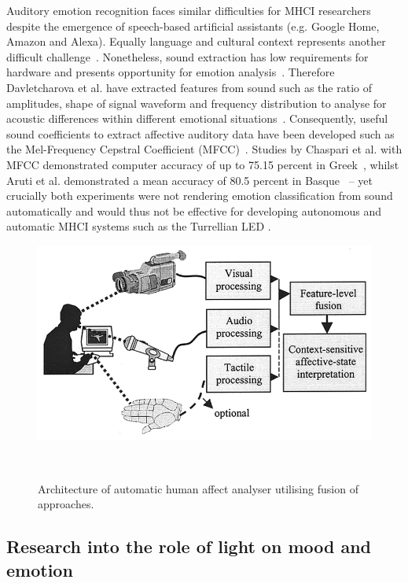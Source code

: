 \documentclass{sigchi}
\begin{document}
Auditory emotion recognition faces similar difficulties for MHCI researchers despite the emergence of speech-based artificial assistants (e.g. Google Home, Amazon and Alexa). Equally language and cultural context represents another difficult challenge~\cite{davletcharova2015detection}. Nonetheless, sound extraction has low requirements for hardware and presents opportunity for emotion analysis~\cite{marechal2019survey}. Therefore Davletcharova et al. have extracted features from sound such as the ratio of amplitudes, shape of signal waveform and frequency distribution to analyse for acoustic differences within different emotional situations~\cite{davletcharova2015detection}. Consequently, useful sound coefficients to extract affective auditory data have been developed such as the Mel-Frequency Cepstral Coefficient (MFCC)~\cite{kathiresan2019cepstral}. Studies by Chaspari et al. with MFCC demonstrated computer accuracy of up to 75.15 percent in Greek~\cite{chaspari2014emotion}, whilst Aruti et al. demonstrated a mean accuracy of 80.5 percent in Basque~\cite{davletcharova2015detection} – yet crucially both experiments were not rendering emotion classification from sound automatically and would thus not be effective for developing autonomous and automatic MHCI systems such as the Turrellian LED .

\begin{figure}
\centering
  \includegraphics[width=0.9\columnwidth]{figures/Architecture}
  \caption{Architecture of automatic human affect analyser utilising fusion of approaches.}~\cite{pantic2003toward}~\label{fig:figure3}
\end{figure}

\subsection{Research into the role of light on mood and emotion}
\end{document}
